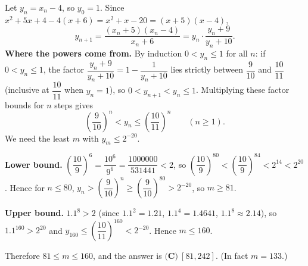Let $y_n=x_n-4$, so $y_0=1$. Since $x^2+5x+4-4(x+6)=x^2+x-20=(x+5)(x-4)$,
\[
y_{n+1}=\dfrac{(x_n+5)(x_n-4)}{x_n+6}=y_n\cdot\dfrac{y_n+9}{y_n+10}.
\]
\textbf{Where the powers come from.} By induction $0<y_n\le1$ for all $n$: if $0<y_n\le1$, the factor $\dfrac{y_n+9}{y_n+10}=1-\dfrac{1}{y_n+10}$ lies strictly between $\dfrac{9}{10}$ and $\dfrac{10}{11}$ (inclusive at $\dfrac{10}{11}$ when $y_n=1$), so $0<y_{n+1}<y_n\le1$. Multiplying these factor bounds for $n$ steps gives
\[
\left(\dfrac{9}{10}\right)^n<y_n\le\left(\dfrac{10}{11}\right)^n\qquad(n\ge1).
\]
We need the least $m$ with $y_m\le2^{-20}$.

\textbf{Lower bound.} $\left(\dfrac{10}{9}\right)^6=\dfrac{10^6}{9^6}=\dfrac{1000000}{531441}<2$, so $\left(\dfrac{10}{9}\right)^{80}<\left(\dfrac{10}{9}\right)^{84}<2^{14}<2^{20}$. Hence for $n\le80$, $y_n>\left(\dfrac{9}{10}\right)^{n}\ge\left(\dfrac{9}{10}\right)^{80}>2^{-20}$, so $m\ge81$.

\textbf{Upper bound.} $1.1^8>2$ (since $1.1^2=1.21$, $1.1^4=1.4641$, $1.1^8\approx2.14$), so $1.1^{160}>2^{20}$ and $y_{160}\le\left(\dfrac{10}{11}\right)^{160}<2^{-20}$. Hence $m\le160$.

Therefore $81\le m\le160$, and the answer is $\boxed{\textbf{(C)}\ [81,242]}$. (In fact $m=133$.)
